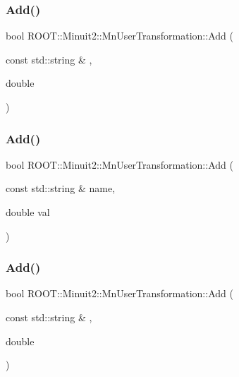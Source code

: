\subsubsection{\texorpdfstring{Add()}{Add()}\hspace{0.1cm}{\footnotesize\ttfamily [7/9]}}
{\footnotesize\ttfamily bool R\+O\+O\+T\+::\+Minuit2\+::\+Mn\+User\+Transformation\+::\+Add (\begin{DoxyParamCaption}\item[{const std\+::string \&}]{,  }\item[{double}]{ }\end{DoxyParamCaption})}

\mbox{\label{classROOT_1_1Minuit2_1_1MnUserTransformation_acf1aa6f4f5c65405a3b9e700ae806e44}} 
\subsubsection{\texorpdfstring{Add()}{Add()}\hspace{0.1cm}{\footnotesize\ttfamily [8/9]}}
{\footnotesize\ttfamily bool R\+O\+O\+T\+::\+Minuit2\+::\+Mn\+User\+Transformation\+::\+Add (\begin{DoxyParamCaption}\item[{const std\+::string \&}]{name,  }\item[{double}]{val }\end{DoxyParamCaption})}

\mbox{\label{classROOT_1_1Minuit2_1_1MnUserTransformation_acf1aa6f4f5c65405a3b9e700ae806e44}} 
\subsubsection{\texorpdfstring{Add()}{Add()}\hspace{0.1cm}{\footnotesize\ttfamily [9/9]}}
{\footnotesize\ttfamily bool R\+O\+O\+T\+::\+Minuit2\+::\+Mn\+User\+Transformation\+::\+Add (\begin{DoxyParamCaption}\item[{const std\+::string \&}]{,  }\item[{double}]{ }\end{DoxyParamCaption})}

